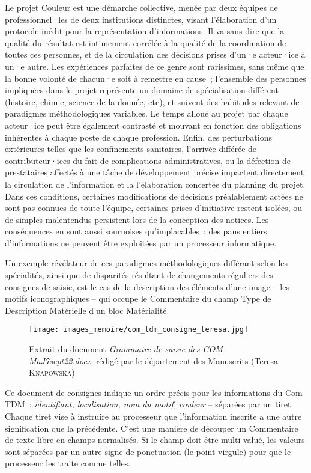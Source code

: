 \documentclass[a4paper,12pt, twoside]{book}
\begin{document}
Le projet Couleur est une démarche collective, menée par deux équipes de professionnel·les de deux institutions distinctes, visant l’élaboration d’un protocole inédit pour la représentation d’informations. Il va sans dire que la qualité du résultat est intimement corrélée à la qualité de la coordination de toutes ces personnes, et de la circulation des décisions prises d’un·e acteur·ice à un·e autre. Les expériences parfaites de ce genre sont rarissimes, sans même que la bonne volonté de chacun·e soit à remettre en cause~; l’ensemble des personnes impliquées dans le projet représente un domaine de spécialisation différent (histoire, chimie, science de la donnée, etc), et suivent des habitudes relevant de paradigmes méthodologiques variables. Le temps alloué au projet par chaque acteur·ice peut être également contrasté et mouvant en fonction des obligations inhérentes à chaque poste de chaque profession. Enfin, des perturbations extérieures telles que les confinements sanitaires, l’arrivée différée de contributeur·ices du fait de complications administratives, ou la défection de prestataires affectés à une tâche de développement précise impactent directement la circulation de l’information et la l’élaboration concertée du planning du projet. Dans ces conditions, certaines modifications de décisions préalablement actées ne sont pas connues de toute l’équipe, certaines prises d’initiative restent isolées, ou de simples malentendus persistent lors de la conception des notices. Les conséquences en sont aussi sournoises qu’implacables~: des pans entiers d’informations ne peuvent être exploitées par un processeur informatique.

Un exemple révélateur de ces paradigmes méthodologiques différant selon les spécialités, ainsi que de disparités résultant de changements réguliers des consignes de saisie, est le cas de la description des éléments d’une image – les motifs iconographiques – qui occupe le \textsf{Commentaire} du champ \textsf{Type de Description Matérielle} d’un bloc \textsf{Matérialité}.

\begin{figure}[!h]
    \centering
    \texttt{[image: images\_memoire/com\_tdm\_consigne\_teresa.jpg]}
    \caption*{Extrait du document \textit{Grammaire de saisie des COM MaJ7sept22.docx}, rédigé par le département des Manuscrits (Teresa \textsc{Knapowska})}
    \label{Consignes de saisie initiale}
\end{figure}

Ce document de consignes indique un ordre précis pour les informations du \textsf{Com TDM}~: \textit{identifiant, localisation, nom du motif, couleur} – séparées par un tiret. Chaque tiret vise à instruire au processeur que l’information inscrite a une autre signification que la précédente. C’est une manière de découper un \textsf{Commentaire} de texte libre en champs normalisés. Si le champ doit être multi-valué, les valeurs sont séparées par un autre signe de ponctuation (le point-virgule) pour que le processeur les traite comme telles.
\end{document}
